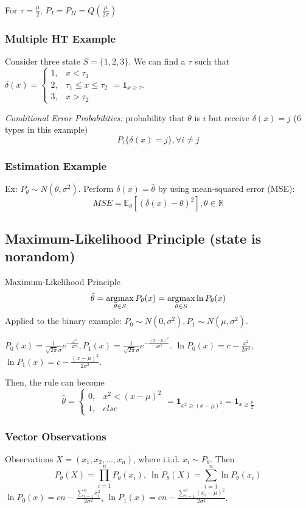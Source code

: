 \documentclass[11pt,a4paper]{article}
\newcommand{\argmax}{\operatornamewithlimits{argmax}}
\begin{document}
For $\tau=\frac{\mu}{2}$, $P_I=P_{II}=Q\left(\frac{\mu}{2\sigma}\right)$

\subsubsection*{Multiple HT Example}
Consider three state $S=\{1,2,3\}$.
We can find a $\tau$ such that $\delta(x)=\left\{\begin{matrix}
    1,&x< \tau_1\\
    2,& \tau_1\leq x\leq \tau_2\\
    3,& x>\tau_2
\end{matrix}\right.=\mathbf{1}_{x\geq \tau}$.

\textit{Conditional Error Probabilities:} probability that $\theta$ is $i$ but receive $\delta(x)=j$ (6 types in this example) $$P_i\{\delta(x)=j\}, \forall i\neq j$$

\subsubsection*{Estimation Example}
Ex: $P_\theta\sim N(\theta,\sigma^2)$. Perform $\delta(x)=\hat{\theta}$ by using mean-squared error (MSE):
$$MSE= \mathbb{E}_\theta \left[(\delta(x)-\theta)^2\right],\theta\in \mathbb{R}$$

\subsection{Maximum-Likelihood Principle (state is norandom)}
Maximum-Likelihood Principle $$\hat{\theta}=\argmax_{\theta\in S}P_{\theta}(x)=\argmax_{\theta\in S}\ln P_{\theta}(x)$$
Applied to the binary example: $P_0\sim N(0,\sigma^2), P_1\sim N(\mu,\sigma^2)$.

$P_0(x)=\frac{1}{\sqrt{2\pi}\sigma}e^{-\frac{x^2}{2\sigma^2}}, P_1(x)=\frac{1}{\sqrt{2\pi}\sigma}e^{-\frac{(x-\mu)^2}{2\sigma^2}}$. $\ln P_0(x)=c-\frac{x^2}{2\sigma^2}$, $\ln P_1(x)=c-\frac{(x-\mu)^2}{2\sigma^2}$.

Then, the rule can become $$\hat{\theta}=\left\{\begin{matrix}
    0,&x^2<(x-\mu)^2\\
    1,&else
\end{matrix}\right.=\mathbf{1}_{x^2\geq (x-\mu)^2}=\mathbf{1}_{x\geq \frac{\mu}{2}}$$

\subsubsection*{Vector Observations}
Observations $X=\left(x_1,x_2,...,x_n\right)$, where i.i.d. $x_i\sim P_\theta$. Then $$P_\theta(X)=\prod_{i=1}^n P_\theta(x_i),\ \ln P_\theta(X)=\sum_{i=1}^n\ln P_\theta(x_i)$$
$\ln P_0(x)=cn-\frac{\sum_{i=1}^n x_i^2}{2\sigma^2}$, $\ln P_1(x)=cn-\frac{\sum_{i=1}^n(x_i-\mu)^2}{2\sigma^2}$.
\end{document}

